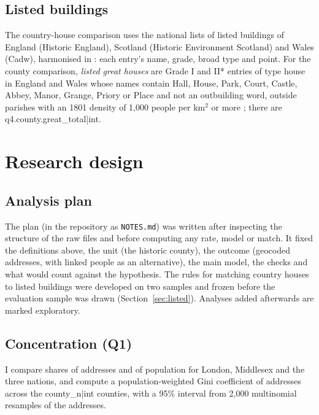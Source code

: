 \documentclass[11pt,a4paper]{article}
\begin{document}
\subsection{Listed buildings}
The country-house comparison uses the national lists of listed buildings of England (Historic England), Scotland (Historic Environment Scotland) and Wales (Cadw), harmonised in \citet{hotham2026listed}: each entry's name, grade, broad type and point. For the county comparison, \textit{listed great houses} are Grade I and II* entries of type house in England and Wales whose names contain Hall, House, Park, Court, Castle, Abbey, Manor, Grange, Priory or Place and not an outbuilding word, outside parishes with an 1801 density of 1,000 people per km$^2$ or more \citep{caprettini2020}; there are {{q4.county.great_total|int}}.

\section{Research design}\label{sec:design}
\subsection{Analysis plan}
The plan (in the repository as \texttt{NOTES.md}) was written after inspecting the structure of the raw files and before computing any rate, model or match. It fixed the definitions above, the unit (the historic county), the outcome (geocoded addresses, with linked people as an alternative), the main model, the checks and what would count against the hypothesis. The rules for matching country houses to listed buildings were developed on two samples and frozen before the evaluation sample was drawn (Section~\ref{sec:listed}). Analyses added afterwards are marked exploratory.

\subsection{Concentration (Q1)}
I compare shares of addresses and of population for London, Middlesex and the three nations, and compute a population-weighted Gini coefficient of addresses across the {{county_n|int}} counties, with a 95\% interval from 2,000 multinomial resamples of the addresses.
\end{document}
